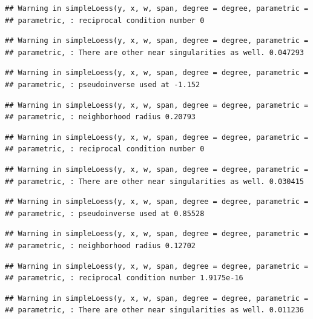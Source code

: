 \documentclass[]{article}
\begin{document}
\begin{verbatim}
## Warning in simpleLoess(y, x, w, span, degree = degree, parametric =
## parametric, : reciprocal condition number 0
\end{verbatim}

\begin{verbatim}
## Warning in simpleLoess(y, x, w, span, degree = degree, parametric =
## parametric, : There are other near singularities as well. 0.047293
\end{verbatim}

\begin{verbatim}
## Warning in simpleLoess(y, x, w, span, degree = degree, parametric =
## parametric, : pseudoinverse used at -1.152
\end{verbatim}

\begin{verbatim}
## Warning in simpleLoess(y, x, w, span, degree = degree, parametric =
## parametric, : neighborhood radius 0.20793
\end{verbatim}

\begin{verbatim}
## Warning in simpleLoess(y, x, w, span, degree = degree, parametric =
## parametric, : reciprocal condition number 0
\end{verbatim}

\begin{verbatim}
## Warning in simpleLoess(y, x, w, span, degree = degree, parametric =
## parametric, : There are other near singularities as well. 0.030415
\end{verbatim}

\begin{verbatim}
## Warning in simpleLoess(y, x, w, span, degree = degree, parametric =
## parametric, : pseudoinverse used at 0.85528
\end{verbatim}

\begin{verbatim}
## Warning in simpleLoess(y, x, w, span, degree = degree, parametric =
## parametric, : neighborhood radius 0.12702
\end{verbatim}

\begin{verbatim}
## Warning in simpleLoess(y, x, w, span, degree = degree, parametric =
## parametric, : reciprocal condition number 1.9175e-16
\end{verbatim}

\begin{verbatim}
## Warning in simpleLoess(y, x, w, span, degree = degree, parametric =
## parametric, : There are other near singularities as well. 0.011236
\end{verbatim}
\end{document}
